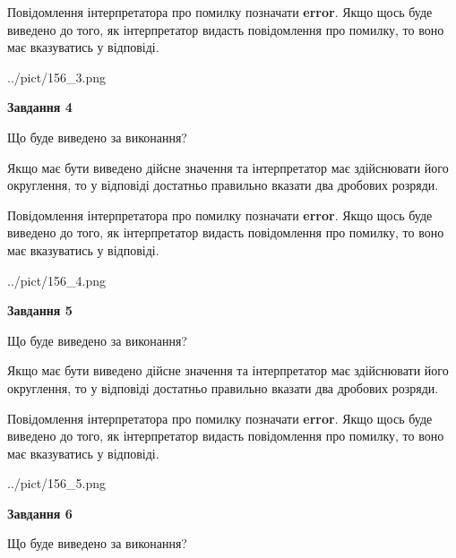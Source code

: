 \documentclass[12pt, ukrainian]{article}
\begin{document}
{\begin {Large}
Повідомлення інтерпретатора про помилку позначати \textbf{error}.
Якщо щось буде виведено до того, як інтерпретатор видасть повідомлення про помилку, 
то воно має вказуватись у відповіді. \par

\begin{center}
	{../pict/156_3.png}
\end{center}
\newpage

{\begin {center}\textbf{Завдання 4}\end {center}}\par
Що буде виведено за виконання? \par

Якщо має бути виведено дійсне значення та інтерпретатор має здійснювати його округлення, 
то у відповіді достатньо правильно вказати два дробових розряди.

Повідомлення інтерпретатора про помилку позначати \textbf{error}.
Якщо щось буде виведено до того, як інтерпретатор видасть повідомлення про помилку, 
то воно має вказуватись у відповіді. \par

\begin{center}
	{../pict/156_4.png}
\end{center}
\newpage

{\begin {center}\textbf{Завдання 5}\end {center}}\par
Що буде виведено за виконання? \par

Якщо має бути виведено дійсне значення та інтерпретатор має здійснювати його округлення, 
то у відповіді достатньо правильно вказати два дробових розряди.

Повідомлення інтерпретатора про помилку позначати \textbf{error}.
Якщо щось буде виведено до того, як інтерпретатор видасть повідомлення про помилку, 
то воно має вказуватись у відповіді. \par

\begin{center}
	{../pict/156_5.png}
\end{center}
\newpage

{\begin {center}\textbf{Завдання 6}\end {center}}\par
Що буде виведено за виконання? \par


\end{Large}}
\end{document}
